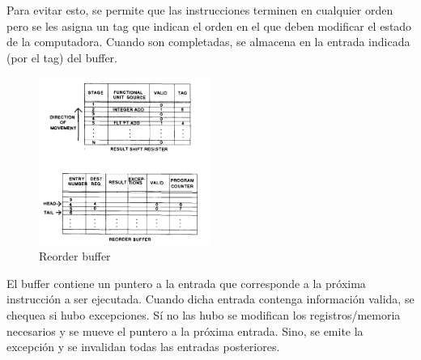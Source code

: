 Para evitar esto, se permite que las instrucciones terminen en cualquier orden pero se les asigna un tag que indican el orden en el que deben modificar el estado de la computadora. Cuando son completadas, se almacena en la entrada indicada (por el tag) del buffer.

\begin{figure}[h]
	\centering
	\includegraphics[width=0.5\textwidth]{imagenes/reorder-buffer}
	\caption{Reorder buffer}
	\label{fig:reorder-buffer}
\end{figure}

El buffer contiene un puntero a la entrada que corresponde a la próxima instrucción a ser ejecutada. Cuando dicha entrada contenga información valida, se  chequea si hubo excepciones. Sí no las hubo se modifican los registros/memoria necesarios y se mueve el puntero a la próxima entrada. Sino, se emite la excepción y se invalidan todas las entradas posteriores.

\nocite{*}





